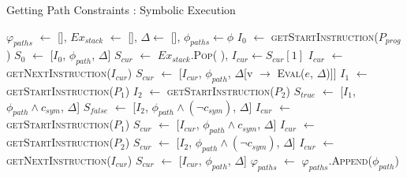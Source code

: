 \documentclass[acmsmall,review]{acmart}\settopmatter{}
\newcommand*\Let[2]{\State #1 $\gets$ #2}
\begin{document}
	\begin{algorithm}
		\caption{Getting Path Constraints : Symbolic Execution}
		\label{alg:symbex}
		\begin{algorithmic}[1]
			\Let{$\varphi_{paths}$}{[]}, {$Ex_{stack}$} $\leftarrow$ {[]}, $\Delta \leftarrow$ {[]}, $\phi_{paths} \leftarrow \phi$  
			\Let{$I_{0}$}{\textsc{getStartInstruction}($P_{prog}$)}
			\Let{$S_{0}$}{[$I_{0}$, $\phi_{path}$, $\Delta$]} 
			 
			\Let{$S_{cur}$}{$Ex_{stack}$.\textsc{Pop}( )}, $I_{cur} \leftarrow S_{cur}[1]$ 
			 \label{line:inst_case}
			  \label{line:assign}
			\Let{$I_{cur}$}{\textsc{getNextInstruction}($I_{cur}$)}
			\Let{$S_{cur}$}{[$I_{cur}$, $\phi_{path}$, $\Delta$[v $\rightarrow$ \textsc{Eval($e$, $\Delta$)}]]}
			\EndCase
			  \label{line:branch}
			 
			\Let{$I_{1}$}{\textsc{getStartInstruction}($P_{1}$)} \Let{$I_{2}$} {\textsc{getStartInstruction}($P_{2}$)}	
			\Let{$S_{true}$}{[$I_{1}$, $\phi_{path} \wedge c_{sym}$, $\Delta$]} \label{line:true_state}
			\Let{$S_{false}$}{[$I_{2}$, $\phi_{path} \wedge (\neg c_{sym})$, $\Delta$]} \label{line:false_state}
			 
			 
			\Let{$I_{cur}$}{\textsc{getStartInstruction}($P_{1}$)}
			\Let {$S_{cur}$}{[$I_{cur}$, $\phi_{path} \wedge c_{sym}$, $\Delta$]}
			 
			\Let{$I_{cur}$}{\textsc{getStartInstruction}($P_{2}$)}
			\Let{$S_{cur}$}{[$I_{2}$, $\phi_{path} \wedge (\neg c_{sym})$, $\Delta$]}
			\Else {}
			\Let{$I_{cur}$}{\textsc{getNextInstruction}($I_{cur}$)}
			\Let{$S_{cur}$}{[$I_{cur}$, $\phi_{path}$, $\Delta$]}
			\State {$Ex_{stack}$.\textsc{Push}({$S_{cur}$})}
			\EndIf
			\EndCase
			 
			\Let{$\varphi_{paths}$}{$\varphi_{paths}$.\textsc{Append}($\phi_{path}$)}		
			\EndCase
			\EndSwitch
			\EndWhile \\
			\EndFunction
		\end{algorithmic}
	\end{algorithm}
	
\end{document}
